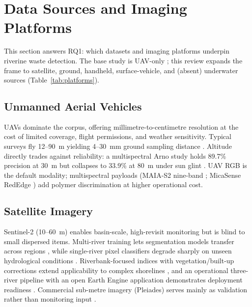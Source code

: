 \section{Data Sources and Imaging Platforms}
\label{sec:datasources}

This section answers RQ1: which datasets and imaging platforms underpin riverine waste detection. The base study is UAV-only \cite{Pati2025}; this review expands the frame to satellite, ground, handheld, surface-vehicle, and (absent) underwater sources (Table~\ref{tab:platforms}).

\subsection{Unmanned Aerial Vehicles}
UAVs dominate the corpus, offering millimetre-to-centimetre resolution at the cost of limited coverage, flight permissions, and weather sensitivity. Typical surveys fly 12--90~m yielding 4--30~mm ground sampling distance \cite{Jakovljevic2020,Maharjan2022,Pati2025}. Altitude directly trades against reliability: a multispectral Arno study holds 89.7\% precision at 30~m but collapses to 33.9\% at 80~m under sun glint \cite{Cortesi2022}. UAV RGB is the default modality; multispectral payloads (MAIA-S2 nine-band \cite{Cortesi2022}; MicaSense RedEdge \cite{Iordache2022}) add polymer discrimination at higher operational cost.

\subsection{Satellite Imagery}
Sentinel-2 (10--60~m) enables basin-scale, high-revisit monitoring but is blind to small dispersed items. Multi-river training lets segmentation models transfer across regions \cite{SoleGomez2022}, while single-river pixel classifiers degrade sharply on unseen hydrological conditions \cite{Mohsen2023}. Riverbank-focused indices with vegetation/built-up corrections extend applicability to complex shorelines \cite{Sakti2023}, and an operational three-river pipeline with an open Earth Engine application demonstrates deployment readiness \cite{PerezGarcia2025}. Commercial sub-metre imagery (Pleiades) serves mainly as validation rather than monitoring input \cite{Sakti2023}.

